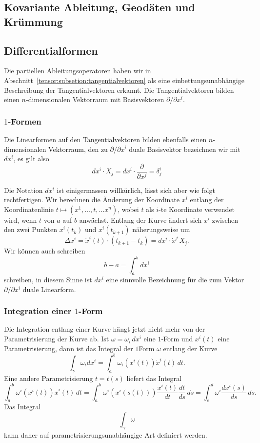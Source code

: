 \subsection{Kovariante Ableitung, Geodäten und Krümmung}

\subsection{Differentialformen}
Die partiellen Ableitungsoperatoren haben wir in
Abschnitt~\ref{tensor:subsetion:tangentialvektoren}
als eine einbettungsunabhängige Beschreibung der Tangentialvektoren
erkannt.
Die Tangentialvektoren bilden einen $n$-dimensionalen Vektorraum
mit Basisvektoren $\partial/\partial x^i$.

\subsubsection{$1$-Formen}
Die Linearformen auf den Tangentialvektoren bilden ebenfalls einen
$n$-dimensionalen Vektorraum, den zu $\partial/\partial x^i$ duale Basisvektor
bezeichnen wir mit $dx^i$, es gilt also
\[
dx^i \cdot X_j = dx^i \cdot \frac{\partial}{\partial x^j}=\delta^i_j
\]

Die Notation $dx^i$ ist einigermassen willkürlich, lässt sich aber
wie folgt rechtfertigen.
Wir berechnen die Änderung der Koordinate $x^i$ entlang 
der Koordinatenlinie $t\mapsto (x^1,\dots,t,\dots x^n)$, wobei $t$
als $i$-te Koordinate verwendet wird, wenn $t$ von $a$ auf $b$ anwächst.
Entlang der Kurve ändert sich $x^i$ zwischen den zwei Punkten
$x^i(t_k)$ und $x^i(t_{k+1})$ näherungsweise um 
\[
\Delta x^i
=
\dot x^i(t) \cdot (t_{k+1}-t_k)
=
dx^i \cdot \dot x^j\, X_j.
\]
Wir können auch schreiben
\[
b-a
=
\int_a^b dx^i
\]
schreiben, in diesem Sinne ist $dx^i$ eine sinnvolle Bezeichnung für die
zum Vektor $\partial/\partial x^i$ duale Linearform.

\subsubsection{Integration einer $1$-Form}
Die Integration entlang einer Kurve hängt jetzt nicht mehr von der
Parametrisierung der Kurve ab.
Ist $\omega = \omega_i\,dx^i$ eine $1$-Form und $x^i(t)$ eine
Parametrisierung, dann ist das Integral der $1$Form $\omega$
entlang der Kurve
\[
\int_{\gamma} \omega_i dx^i
=
\int_a^b \omega_i(x^i(t))\dot x^i(t)\,dt.
\]
Eine andere Parametrisierung $t=t(s)$ liefert das Integral
\[
\int_a^b \omega^i(x^i(t)) \dot x^i(t)\,dt
=
\int_a^b \omega^i(x^i(s(t))) \frac{x^i(t)}{dt} \frac{dt}{ds}\,ds
=
\int_c^d \omega^i \frac{dx^i(s)}{ds}\,ds.
\]
Das Integral
\[
\int_\gamma \omega
\]
kann daher auf parametrisierungsunabhängige Art definiert werden.

